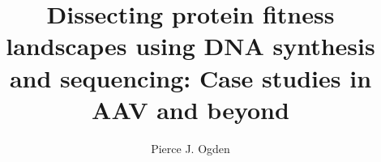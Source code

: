 \title{Dissecting protein fitness landscapes using DNA synthesis and sequencing: Case studies in AAV and beyond}
\author{Pierce J. Ogden}


